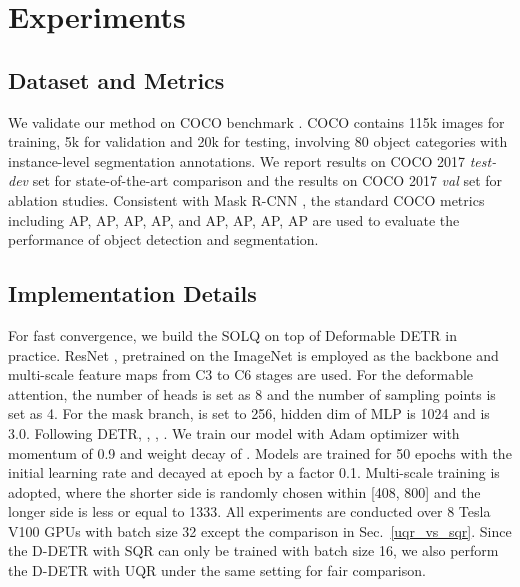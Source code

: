 \documentclass{article}
\begin{document}
\section{Experiments}
\subsection{Dataset and Metrics}
We validate our method on COCO benchmark \cite{lin2014microsoft}. COCO contains 115k images for training, 5k for validation and 20k for testing, involving 80 object categories with instance-level segmentation annotations. We report results on COCO 2017 \textit{test-dev} set for state-of-the-art comparison and the results on COCO 2017 \textit{val} set for ablation studies. Consistent with Mask R-CNN \cite{he2017maskrcnn}, the standard COCO metrics including AP, AP, AP, AP, and AP, AP, AP, AP are used to evaluate the performance of object detection and segmentation.

\subsection{Implementation Details}
\label{imple_detail}
For fast convergence, we build the SOLQ on top of Deformable DETR \cite{zhu2020deformabledetr} in practice. ResNet \cite{he2016deep}, pretrained on the ImageNet \cite{Russakovsky2015ImageNet} is employed as the backbone and multi-scale feature maps from C3 to C6 stages are used. For the deformable attention, the number of heads is set as 8 and the number of sampling points is set as 4. For the mask branch,  is set to 256, hidden dim of MLP is 1024 and  is 3.0. Following DETR, , , . We train our model with Adam optimizer with momentum of 0.9 and weight decay of . Models are trained for 50 epochs with the initial learning rate  and decayed at  epoch by a factor 0.1. Multi-scale training is adopted, where the shorter side is randomly chosen within [408, 800] and the longer side is less or equal to 1333. All experiments are conducted over 8 Tesla V100 GPUs with batch size 32 except the comparison in Sec.~\ref{uqr_vs_sqr}. Since the D-DETR with SQR can only be trained with batch size 16, we also perform the D-DETR with UQR under the same setting for fair comparison. 
\end{document}
